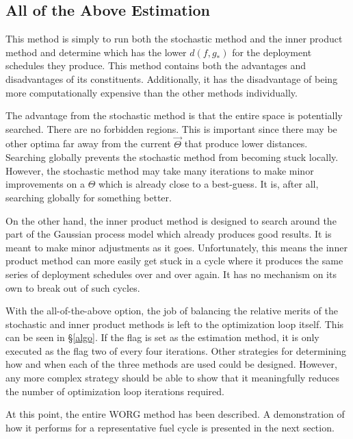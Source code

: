 \subsection{All of the Above Estimation}
\label{all}

This method is simply to run both the stochastic method and the inner product
method and determine which has the lower $d(f, g_*)$ for the deployment 
schedules they produce.  This method contains both the advantages and 
disadvantages of its constituents.  Additionally, it has the disadvantage 
of being more computationally expensive than the other methods individually.

The advantage from the stochastic method is that the entire space is 
potentially searched. There are no forbidden regions.
This is important since there may be other
optima far away from the current $\vec{\Theta}$ that produce lower distances.
Searching globally prevents the stochastic method from becoming stuck locally.
However, the stochastic method may take many iterations to 
make minor improvements on a $\Theta$ which is already close to a best-guess.
It is, after all, searching globally for something better.

On the other hand, the inner product method is designed to search around 
the part of the Gaussian process model which already produces good results. It
is meant to make minor adjustments as it goes.  Unfortunately, this means
the inner product method can more easily get stuck in a cycle  where it 
produces the same series of deployment schedules over and over again. 
It has no mechanism on its own to break out of such cycles.

With the all-of-the-above option, the job of balancing the relative merits
of the stochastic and inner product methods is left to the optimization 
loop itself.  This can be seen in \S\ref{algo}.  If the \allflag flag 
is set as the estimation method, it is only executed as the \allflag flag 
two of every four 
iterations.  Other strategies for determining how and when each of the 
three methods are used could be designed. However, any more complex strategy 
should be able to show that it meaningfully reduces the number of 
optimization loop iterations required.

At this point, the entire WORG method has been described. A
demonstration of how it performs for a representative fuel cycle is 
presented in the next section. 
